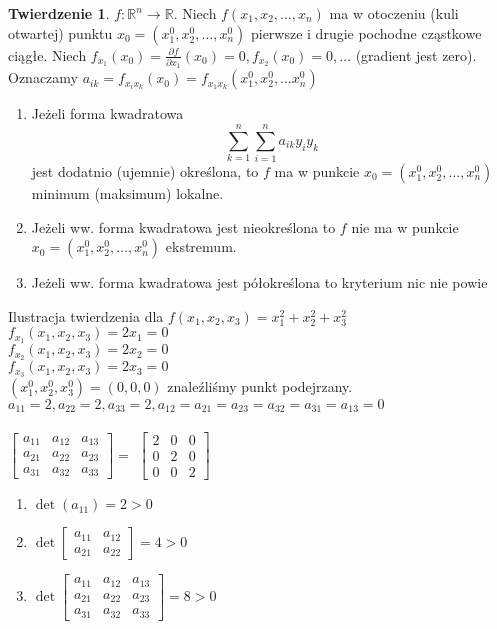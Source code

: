 \documentclass{article}
\theoremstyle{definition}
\theoremstyle{definition}
\newtheorem{tw}{Twierdzenie}[subsection]
\theoremstyle{definition}
\theoremstyle{definition}
\begin{document}
\begin{tw}
    $f: \mathbb{R}^n \rightarrow \mathbb{R}$. Niech $f(x_1, x_2, \dots, x_n)$ ma w otoczeniu (kuli otwartej) punktu $x_0=(x_1^0,x_2^0,\dots,x_n^0)$ 
    pierwsze i drugie pochodne cząstkowe ciągłe. Niech $f_{x_1}(x_0)=\frac{\partial f}{\partial x_1}(x_0)=0, f_{x_2}(x_0)=0, \dots$ (gradient jest zero).
    Oznaczamy $a_{ik} = f_{x_i x_k} (x_0) = f_{x_1 x_k} (x_1^0, x_2^0,\dots x_n^0)$
    \begin{enumerate}
        \item Jeżeli forma kwadratowa \[\sum_{k=1}^{n} \sum_{i=1}^{n} a_{ik} y_{i} y_{k}\]
        jest dodatnio (ujemnie) określona, to $f$ ma w punkcie $x_0=(x_1^0,x_2^0,\dots,x_n^0)$ minimum (maksimum) lokalne.
        \item Jeżeli ww. forma kwadratowa jest nieokreślona to $f$ nie ma w punkcie $x_0=(x_1^0,x_2^0,\dots,x_n^0)$ ekstremum.
        \item Jeżeli ww. forma kwadratowa jest półokreślona to kryterium nic nie powie
    \end{enumerate}
\end{tw}
Ilustracja twierdzenia dla
$f(x_1,x_2,x_3)=x_1^2+x_2^2+x_3^2$\\
$f_{x_1} (x_1,x_2,x_3) = 2x_1 =0$\\
$f_{x_2} (x_1,x_2,x_3) = 2x_2 =0$\\
$f_{x_3} (x_1,x_2,x_3) = 2x_3 =0$\\
$(x_1^0, x_2^0, x_3^0) = (0,0,0)$ znaleźliśmy punkt podejrzany.\\
$a_{11}=2, a_{22}=2, a_{33}=2, a_{12}=a_{21}=a_{23}=a_{32}=a_{31}=a_{13}=0$\\\\
$ \begin{bmatrix}
a_{11} & a_{12} & a_{13} \\
a_{21} & a_{22} & a_{23} \\
a_{31} & a_{32} & a_{33} 
\end{bmatrix} = $
$ \begin{bmatrix}
2 & 0 & 0 \\
0 & 2 & 0 \\
0 & 0 & 2
\end{bmatrix} $\\
\begin{enumerate}
    \item $\det\left(a_{11}\right) = 2 > 0$
    \item $\det\begin{bmatrix}
    a_{11} & a_{12} \\
    a_{21} & a_{22} 
    \end{bmatrix} = 4 > 0$
    \item $\det\begin{bmatrix}
        a_{11} & a_{12} & a_{13} \\
        a_{21} & a_{22} & a_{23} \\
        a_{31} & a_{32} & a_{33} 
        \end{bmatrix}=8>0$
\end{enumerate}
\end{document}
